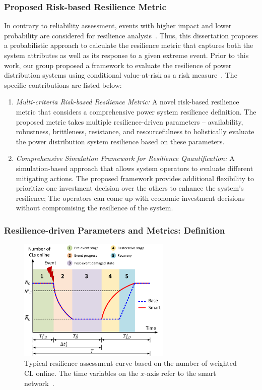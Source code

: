 \subsubsection{Proposed Risk-based Resilience Metric}
In contrary to reliability assessment, events with higher impact and lower probability are considered for resilience analysis~\cite{panteli2015grid}. Thus, this dissertation proposes a probabilistic approach to calculate the resilience metric that captures both the system attributes as well as its response to a given extreme event. Prior to this work, our group proposed a framework to evaluate the resilience of power distribution systems using conditional value-at-risk as a risk measure~\cite{poudel2019risk}. The specific contributions are listed below:

\begin{enumerate}
    \item \textit{Multi-criteria Risk-based Resilience Metric:} A novel risk-based resilience metric that considers a comprehensive power system resilience definition. The proposed metric takes multiple resilience-driven parameters -- availability, robustness, brittleness, resistance, and resourcefulness to holistically evaluate the power distribution system resilience based on these parameters. 
    \item \textit{Comprehensive Simulation Framework for Resilience Quantification:} A simulation-based approach that allows system operators to evaluate different mitigating actions. The proposed framework provides additional flexibility to prioritize one investment decision over the others to enhance the system's resilience; The operators can come up with economic investment decisions without compromising the resilience of the system.   
\end{enumerate}

\subsubsection{Resilience-driven Parameters and Metrics: Definition}

\begin{figure}[!ht!]
    \centering
    \includegraphics[width=0.65\textwidth]{figures/resilience_curve.png}
    \caption{Typical resilience assessment curve based on the number of weighted CL online. The time variables on the $x$-axis refer to the smart network~\cite{2016}.}
    \label{fig:resilience_curve}
\end{figure}

